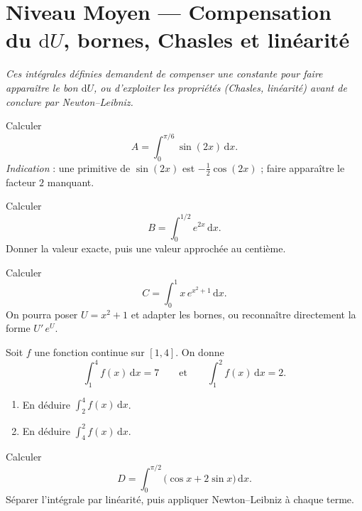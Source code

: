 \documentclass[11pt,a4paper]{article}
\newcommand{\dd}{\mathrm{d}}
\begin{document}
\section*{Niveau Moyen — Compensation du $\dd U$, bornes, Chasles et linéarité}

\begin{center}
\itshape\small Ces intégrales définies demandent de compenser une constante pour faire apparaître le
bon $\dd U$, ou d'exploiter les propriétés (Chasles, linéarité) avant de conclure par
Newton--Leibniz.
\end{center}

\medskip

\begin{exo}
Calculer
\[
A=\int_0^{\pi/6}\sin(2x)\,\dd x.
\]
\emph{Indication} : une primitive de $\sin(2x)$ est $-\tfrac12\cos(2x)$ ; faire apparaître le
facteur $2$ manquant.
\end{exo}

\begin{exo}
Calculer
\[
B=\int_0^{1/2} e^{2x}\,\dd x.
\]
Donner la valeur exacte, puis une valeur approchée au centième.
\end{exo}

\begin{exo}[3 — le $\dd U$ presque présent]
Calculer
\[
C=\int_0^{1} x\,e^{x^2+1}\,\dd x.
\]
On pourra poser $U=x^2+1$ et adapter les bornes, ou reconnaître directement la forme
$U'\,e^{U}$.
\end{exo}

\begin{exo}
Soit $f$ une fonction continue sur $[1,4]$. On donne
\[
\int_1^4 f(x)\,\dd x=7\qquad\text{et}\qquad \int_1^2 f(x)\,\dd x=2.
\]
\begin{enumerate}[label=\alph*),leftmargin=1.8em]
  \item En déduire $\displaystyle\int_2^4 f(x)\,\dd x$.
  \item En déduire $\displaystyle\int_4^2 f(x)\,\dd x$.
\end{enumerate}
\end{exo}

\begin{exo}
Calculer
\[
D=\int_0^{\pi/2}\bigl(\cos x+2\sin x\bigr)\,\dd x.
\]
Séparer l'intégrale par linéarité, puis appliquer Newton--Leibniz à chaque terme.
\end{exo}
\end{document}
